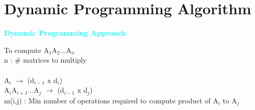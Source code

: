 \documentclass[algorithm,pgfplots]{cuzbeamer}
\begin{document}
    \section{Dynamic Programming Algorithm}
    
   \begin{frame}
   \begin{block}{\large{\textcolor{cyan}{\textbf{Dynamic Programming Approach}}}}\vspace{1cm}
   
       To compute A$_{1}$A$_{2}$...A$_{n}$ \\
       n : \# matrices to multiply \\ 
       \\
       A$_{i}$ $\rightarrow$ (d$_{i-1}$ x d$_{i}$)   \\
       A$_{i}$A$_{i+1}$...A$_{j}$ $\rightarrow$ (d$_{i-1}$ x d$_{j}$)  \\
              m(i,j) : Min number of operations required to compute product of A$_i$ to A$_j$ 
   \end{block}
   \end{frame}
\end{document}
